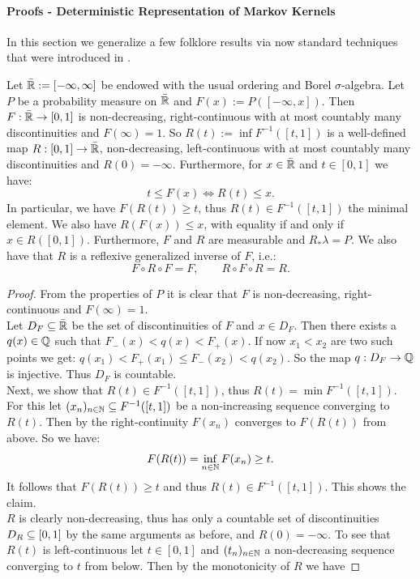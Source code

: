 \paragraph{Proofs - Deterministic Representation of Markov Kernels }

In this section we generalize a few folklore results via now standard techniques that were introduced in \cite{Dar53,Cen82}.

\begin{Lem}
\label{cdf}
Let $\bar{\mathbb{R}} := [-\infty,\infty]$ be endowed with the usual ordering and Borel $\sigma$-algebra.
Let $P$ be a probability measure on $\bar{\mathbb{R}}$  and $F(x):=P([-\infty,x])$.
Then $F: \bar{\mathbb{R}} \to [0,1]$ is non-decreasing, right-continuous with at most countably many discontinuities and $F(\infty)=1$.
So $R(t):= \inf F^{-1}([t,1])$ is a well-defined map $R: [0,1] \to \bar {\mathbb{R}}$, non-decreasing, left-continuous  with at most countably many discontinuities and $R(0)=-\infty$.
Furthermore, for $x \in \bar {\mathbb{R}}$ and $t \in [0,1]$ we have:
\[ t \le F(x) \iff R(t) \le x.  \] 
In particular, we have $F(R(t)) \ge t$, thus $R(t) \in F^{-1}([t,1])$ the minimal element. We also have $R(F(x)) \le x$,  with equality if and only if $x \in R([0,1])$.
Furthermore, $F$ and $R$ are measurable and $R_*\lambda=P$. %
We also have that $R$ is a reflexive generalized inverse of $F$, i.e.:
\[ F \circ R \circ F = F, \qquad R \circ F \circ R = R.\] 
\begin{proof}
    From the properties of $P$ it is clear that $F$ is non-decreasing, right-continuous and $F(\infty)=1$. \\
    Let $D_F \subseteq \bar{\mathbb{R}}$ be the set of discontinuities of $F$ and $x \in D_F$. Then there exists a $q(x) \in \mathbb{Q}$ such that $F_-(x)< q(x) < F_+(x)$. If now $x_1 < x_2$ are two such points we get:
    $q(x_1) < F_+(x_1) \le F_-(x_2) < q(x_2)$. So the map $q: D_F \to \mathbb{Q}$ is injective. Thus $D_F$ is countable.\\
    Next, we show that $R(t) \in F^{-1}([t,1])$, thus $R(t)= \min F^{-1}([t,1])$.
    For this let $(x_n)_{n \in \mathbb{N}}\subseteq F^{-1}([t,1])$ be a non-increasing sequence converging to $R(t)$. 
    Then by the right-continuity $F(x_n)$ converges to $F(R(t))$ from above. 
    So we have: \[F(R(t)) = \inf_{n \in \mathbb{N}} F(x_n) \ge t.\] 
    It follows that $F(R(t)) \ge t$ and thus $R(t) \in F^{-1}([t,1])$. This shows the claim.\\
    $R$ is clearly non-decreasing, thus has only a countable set of discontinuities $D_R \subseteq [0,1]$ by the same arguments as before, and $R(0)=-\infty$. To see that $R(t)$ is left-continuous let $t \in [0,1]$ and $(t_n)_{n \in\mathbb{N}}$ a non-decreasing sequence converging to $t$ from below. Then by the monotonicity of $R$ we have

\end{proof}
\end{Lem}
